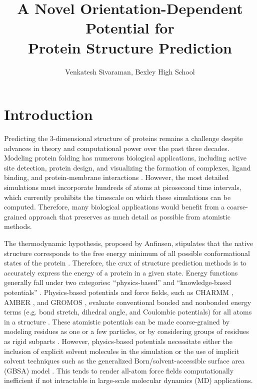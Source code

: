 \documentclass[11pt,twocolumn]{article}
\title{A Novel Orientation-Dependent Potential for \\Protein Structure Prediction}
\author{Venkatesh Sivaraman, Bexley High School}
\begin{document}
\maketitle

\raggedbottom

\begin{abstract}
\end{abstract}

\section{Introduction}
Predicting the 3-dimensional structure of proteins remains a challenge despite advances in theory and computational power over the past three decades.
Modeling protein folding has numerous biological applications, including active site detection, protein design, and visualizing the formation of complexes, ligand binding, and protein-membrane interactions \cite{baker2,kouza,monticelli}.
However, the most detailed simulations must incorporate hundreds of atoms at picosecond time intervals, which currently prohibits the timescale on which these simulations can be computed.
Therefore, many biological applications would benefit from a coarse-grained approach that preserves as much detail as possible from atomistic methods.

The thermodynamic hypothesis, proposed by Anfinsen, stipulates that the native structure corresponds to the free energy minimum of all possible conformational states of the protein \cite{anfinsen}.
Therefore, the crux of structure prediction methods is to accurately express the energy of a protein in a given state. 
Energy functions generally fall under two categories: ``physics-based'' and ``knowledge-based potentials'' \cite{lu}.
Physics-based potentials and force fields, such as CHARMM \cite{brooks}, AMBER \cite{amber}, and GROMOS \cite{gromos}, evaluate conventional bonded and nonbonded energy terms (e.g. bond stretch, dihedral angle, and Coulombic potentials) for all atoms in a structure \cite{brooks2}.
These atomistic potentials can be made coarse-grained by modeling residues as one or a few particles, or by considering groups of residues as rigid subparts \cite{basdevant,potestio,enciso,monticelli}.
However, physics-based potentials necessitate either the inclusion of explicit solvent molecules in the simulation \cite{onufriev} or the use of implicit solvent techniques such as the generalized Born/solvent-accessible surface area (GBSA) model \cite{feig,roux}.
This tends to render all-atom force fields computationally inefficient if not intractable in large-scale molecular dynamics (MD) applications.
\end{document}

